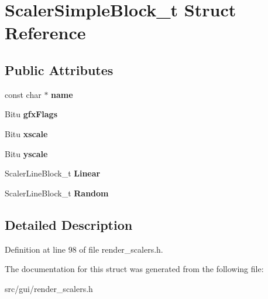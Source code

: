\hypertarget{structScalerSimpleBlock__t}{\section{Scaler\-Simple\-Block\-\_\-t Struct Reference}
\label{structScalerSimpleBlock__t}
}
\subsection*{Public Attributes}
\begin{DoxyCompactItemize}
\item 
\hypertarget{structScalerSimpleBlock__t_a0fdaf375ec143cae7f7b11465ae975ff}{const char $\ast$ {\bfseries name}}\label{structScalerSimpleBlock__t_a0fdaf375ec143cae7f7b11465ae975ff}

\item 
\hypertarget{structScalerSimpleBlock__t_a30bee53c824a6dd88f08b62d88937db3}{Bitu {\bfseries gfx\-Flags}}\label{structScalerSimpleBlock__t_a30bee53c824a6dd88f08b62d88937db3}

\item 
\hypertarget{structScalerSimpleBlock__t_a67eb762fbf4729bc36309adfc1fd3cee}{Bitu {\bfseries xscale}}\label{structScalerSimpleBlock__t_a67eb762fbf4729bc36309adfc1fd3cee}

\item 
\hypertarget{structScalerSimpleBlock__t_a49bc7ebaf5253a00b3c2d457d4eebb4a}{Bitu {\bfseries yscale}}\label{structScalerSimpleBlock__t_a49bc7ebaf5253a00b3c2d457d4eebb4a}

\item 
\hypertarget{structScalerSimpleBlock__t_a0a19750c23eb47b47e7ce6fad76878e2}{Scaler\-Line\-Block\-\_\-t {\bfseries Linear}}\label{structScalerSimpleBlock__t_a0a19750c23eb47b47e7ce6fad76878e2}

\item 
\hypertarget{structScalerSimpleBlock__t_a94844f24c473599f6628b2cc10cdd38b}{Scaler\-Line\-Block\-\_\-t {\bfseries Random}}\label{structScalerSimpleBlock__t_a94844f24c473599f6628b2cc10cdd38b}

\end{DoxyCompactItemize}


\subsection{Detailed Description}


Definition at line 98 of file render\-\_\-scalers.\-h.



The documentation for this struct was generated from the following file\-:\begin{DoxyCompactItemize}
\item 
src/gui/render\-\_\-scalers.\-h\end{DoxyCompactItemize}
